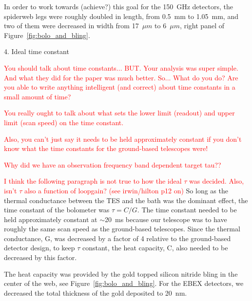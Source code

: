 In order to work towards (achieve?) this goal for the 150~GHz detectors, the spiderweb legs were roughly doubled in length, from 0.5~mm to 1.05~mm, and two of them were decreased in width from 17~$\mu m$ to 6~$\mu m$, right panel of Figure~\ref{fig:bolo_and_bling}. 



4. Ideal time constant

\textcolor{red}{You should talk about time constants... BUT. Your analysis was super simple. And what they did for the paper was much better. So... What do you do? Are you able to write anything intelligent (and correct) about time constants in a small amount of time?}

\textcolor{red}{You really ought to talk about what sets the lower limit (readout) and upper limit (scan speed) on the time constant.}

\textcolor{red}{Also, you can't just say it needs to be held approximately constant if you don't know what the time constants for the ground-based telescopes were!}

\textcolor{red}{Why did we have an observation frequency band dependent target tau??}

\textcolor{red}{I think the following paragraph is not true to how the ideal $\tau$ was decided. Also, isn't $\tau$ also a function of loopgain? (see irwin/hilton p12 on)}
So long as the thermal conductance between the \ac{TES} and the bath was the dominant effect, the time constant of the bolometer was $\tau = C/G$. 
The time constant needed to be held approximately constant at $\sim$20~ms because our telescope was to have roughly the same scan speed as the ground-based telescopes. 
Since the thermal conductance, G, was decreased by a factor of 4 relative to the ground-based detector design, to keep $\tau$ constant, the heat capacity, C, also needed to be decreased by this factor. 

The heat capacity was provided by the gold topped silicon nitride bling in the center of the web, see Figure~\ref{fig:bolo_and_bling}. 
For the \ac{EBEX} detectors, we decreased the total thickness of the gold deposited to 20~nm. 






